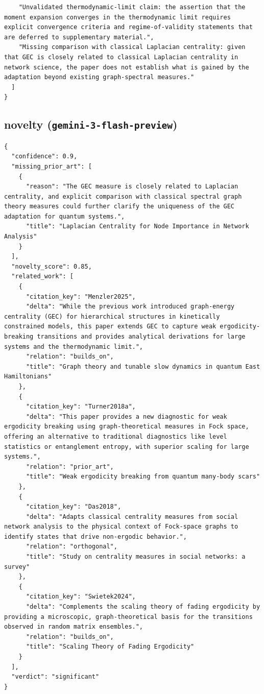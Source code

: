 \documentclass[11pt]{article}
\begin{document}
\begin{verbatim}
    "Unvalidated thermodynamic-limit claim: the assertion that the moment expansion converges in the thermodynamic limit requires explicit convergence criteria and regime-of-validity statements that are deferred to supplementary material.",
    "Missing comparison with classical Laplacian centrality: given that GEC is closely related to classical Laplacian centrality in network science, the paper does not establish what is gained by the adaptation beyond existing graph-spectral measures."
  ]
}
\end{verbatim}

\subsection*{novelty (\texttt{gemini-3-flash-preview})}
\begin{verbatim}
{
  "confidence": 0.9,
  "missing_prior_art": [
    {
      "reason": "The GEC measure is closely related to Laplacian centrality, and explicit comparison with classical spectral graph theory measures could further clarify the uniqueness of the GEC adaptation for quantum systems.",
      "title": "Laplacian Centrality for Node Importance in Network Analysis"
    }
  ],
  "novelty_score": 0.85,
  "related_work": [
    {
      "citation_key": "Menzler2025",
      "delta": "While the previous work introduced graph-energy centrality (GEC) for hierarchical structures in kinetically constrained models, this paper extends GEC to capture weak ergodicity-breaking transitions and provides analytical derivations for large systems and the thermodynamic limit.",
      "relation": "builds_on",
      "title": "Graph theory and tunable slow dynamics in quantum East Hamiltonians"
    },
    {
      "citation_key": "Turner2018a",
      "delta": "This paper provides a new diagnostic for weak ergodicity breaking using graph-theoretical measures in Fock space, offering an alternative to traditional diagnostics like level statistics or entanglement entropy, with superior scaling for large systems.",
      "relation": "prior_art",
      "title": "Weak ergodicity breaking from quantum many-body scars"
    },
    {
      "citation_key": "Das2018",
      "delta": "Adapts classical centrality measures from social network analysis to the physical context of Fock-space graphs to identify states that drive non-ergodic behavior.",
      "relation": "orthogonal",
      "title": "Study on centrality measures in social networks: a survey"
    },
    {
      "citation_key": "Swietek2024",
      "delta": "Complements the scaling theory of fading ergodicity by providing a microscopic, graph-theoretical basis for the transitions observed in random matrix ensembles.",
      "relation": "builds_on",
      "title": "Scaling Theory of Fading Ergodicity"
    }
  ],
  "verdict": "significant"
}
\end{verbatim}
\end{document}
